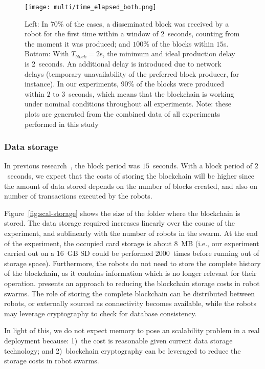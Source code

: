 \documentclass[runningheads]{llncs}
\begin{document}
\begin{figure}
  \centering
  \texttt{[image: multi/time\_elapsed\_both.png]}
  \caption{Left: In 70\% of the cases, a disseminated block was received by a robot for the first time within a window of $2$~seconds, counting from the moment it was produced; and $100$\% of the blocks within $15$s. Bottom: With $T_{block}=2$s, the minimum and ideal production delay is $2$~seconds. An additional delay is introduced due to network delays (temporary unavailability of the preferred block producer, for instance). In our experiments, 90\% of the blocks were produced within $2$ to $3$~seconds, which means that the blockchain is working under nominal conditions throughout all experiments. Note: these plots are generated from the combined data of all experiments performed in this study}
  \label{fig:block-histograms}
\end{figure}

\vspace{-5mm}
\subsubsection{Data storage}

In previous research~\cite{pacheco_ants_2020,StrCasDor2018:aamas}, the block period was $15$~seconds. With a block period of $2$~seconds, we expect that the costs of storing the blockchain will be higher since the amount of data stored depends on the number of blocks created, and also on number of transactions executed by the robots. 

Figure~\ref{fig:scal-storage} shows the size of the folder where the blockchain is stored. The data storage required increases linearly over the course of the experiment, and sublinearly with the number of robots in the swarm. At the end of the experiment, the occupied card storage is about $8$~MB (i.e., our experiment carried out on a $16$~GB SD could be performed $2000$~times before running out of storage space). Furthermore, the robots do not need to store the complete history of the blockchain, as it contains information which is no longer relevant for their operation. \cite{nishida_suppressing_2018} presents an approach to reducing the blockchain storage costs in robot swarms. The role of storing the complete blockchain can be distributed between robots, or externally sourced as connectivity becomes available, while the robots may leverage cryptography to check for database consistency.

In light of this, we do not expect memory to pose an scalability problem in a real deployment because: 1)~the cost is reasonable given current data storage technology; and 2)~blockchain cryptography can be leveraged to reduce the storage costs in robot swarms.
\end{document}

